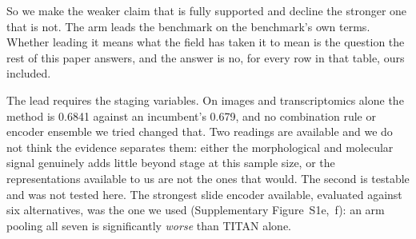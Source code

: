 \documentclass[unnumsec,webpdf,contemporary,large]{oup-authoring-template}
\begin{document}
So we make the weaker claim that is fully supported and decline the stronger one that is not. The
arm leads the benchmark on the benchmark's own terms. Whether leading it means what the field has
taken it to mean is the question the rest of this paper answers, and the answer is no, for every row in that table, ours included.

The lead requires the staging variables. On images and
transcriptomics alone the method is 0.6841 against an incumbent's 0.679, and no combination rule or
encoder ensemble we tried changed that. Two readings are available and we do not think the evidence
separates them: either the morphological and molecular signal genuinely adds little beyond stage at
this sample size, or the representations available to us are not the ones that would. The second is testable and was not tested here. The strongest slide encoder available, evaluated against
six alternatives, was the one we used (Supplementary Figure~S1e,~f): an arm pooling all seven is
significantly \emph{worse} than TITAN alone.
\end{document}
